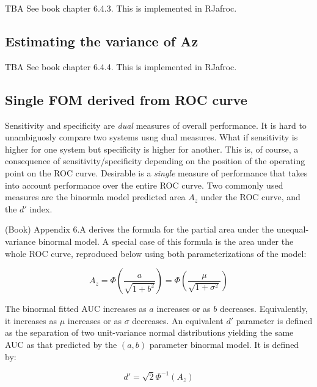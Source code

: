 \documentclass[
]{book}
\begin{document}
TBA See book chapter 6.4.3. This is implemented in RJafroc.

\hypertarget{estimating-the-variance-of-az}{%
\subsection{Estimating the variance of Az}\label{estimating-the-variance-of-az}}

TBA See book chapter 6.4.4. This is implemented in RJafroc.

\hypertarget{single-fom-derived-from-roc-curve}{%
\subsection{Single FOM derived from ROC curve}\label{single-fom-derived-from-roc-curve}}

Sensitivity and specificity are \emph{dual} measures of overall performance. It is hard to unambiguosly compare two systems usng dual measures. What if sensitivity is higher for one system but specificity is higher for another. This is, of course, a consequence of sensitivity/specificity depending on the position of the operating point on the ROC curve. Desirable is a \emph{single} measure of performance that takes into account performance over the entire ROC curve. Two commonly used measures are the binormla model predicted area \(A_z\) under the ROC curve, and the \(d'\) index.

(Book) Appendix 6.A derives the formula for the partial area under the unequal-variance binormal model. A special case of this formula is the area under the whole ROC curve, reproduced below using both parameterizations of the model:

\begin{equation} 
A_z=\Phi\left ( \frac{a}{\sqrt{1+b^2}} \right )=\Phi\left ( \frac{\mu}{\sqrt{1+\sigma^2}} \right )
\label{eq:BinModab2Az}
\end{equation}

The binormal fitted AUC increases as \(a\) increases or as \(b\) decreases. Equivalently, it increases as \(\mu\) increases or as \(\sigma\) decreases. An equivalent \(d'\) parameter is defined as the separation of two unit-variance normal distributions yielding the same AUC as that predicted by the \((a,b)\) parameter binormal model. It is defined by:

\begin{equation} 
d'=\sqrt{2}\Phi^{-1}\left ( A_z \right )
\label{eq:BinModab2dprime}
\end{equation}
\end{document}

